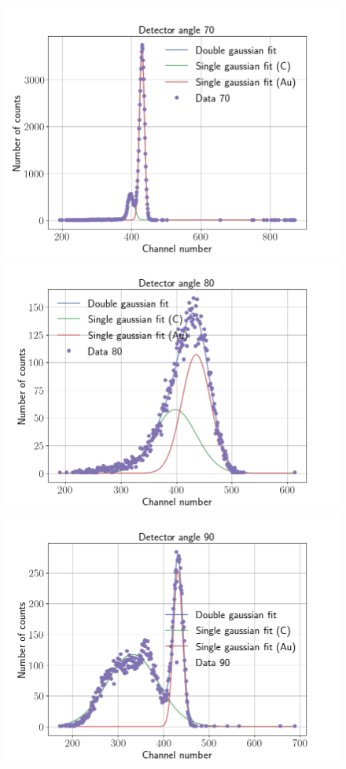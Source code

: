 \begin{figure}[t]
\includegraphics[width=0.99\columnwidth]{Data_70}
\includegraphics[width=0.99\columnwidth]{Data_80}
\includegraphics[width=0.99\columnwidth]{Data_90}
\end{figure}

